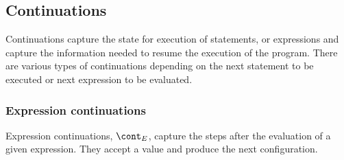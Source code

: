 \documentclass{article}
\begin{document}
\subsection{Continuations}
\label{subsec:continuations-definition}

\newcommand{\expressionmeta}{\ensuremath{\mathit{E}}}
\newcommand{\expressionsmeta}{\expressionmeta{s}}
\newcommand{\variablemeta}{\ensuremath{\mathit{X}}}
\newcommand{\boolmeta}{\ensuremath{\mathit{B}}}
\newcommand{\integermeta}{\ensuremath{\mathit{I}}}
\newcommand{\doublemeta}{\ensuremath{\mathit{D}}}
\newcommand{\stringmeta}{\ensuremath{\mathit{S}}}
\newcommand{\idmeta}{\ensuremath{\mathit{X}}}
\newcommand{\membermeta}{\ensuremath{\mathit{M}}}
\newcommand{\typemeta}{\ensuremath{\mathit{T}}}
\newcommand{\statementmeta}{\ensuremath{\mathit{\stmt}}}
\newcommand{\labelmeta}{\ensuremath{\mathit{\tt{L}}}}

Continuations capture the state for execution of statements, or expressions and capture the information needed to resume the execution of the program.
There are various types of continuations depending on the next statement to be executed or next expression to be evaluated.
\subsubsection{Expression continuations}
\label{subsubsec:expression-continuations}

Expression continuations, $\econt$, capture the steps after the evaluation of a given expression.
They accept a value and produce the next configuration.
\end{document}
